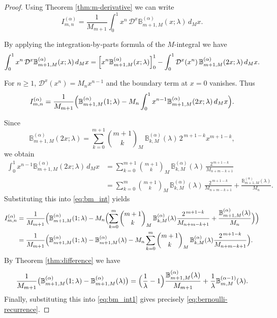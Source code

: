 \documentclass[12pt, a4paper]{article}
\theoremstyle{definition}
\numberwithin{equation}{section}
\newcommand{\B}{\mathbb{B}}
\begin{document}
\begin{proof}
Using Theorem \ref{thm:m-derivative} we can write
\[
I_{m,n}^{(\alpha)}=\frac{1}{M_{m+1}}\int_0^1 x^n\,\mathcal{D}^x\B_{m+1,M}^{(\alpha)}(x;\lambda)\,d_M x.
\]

By applying the integration‑by‑parts formula of the $M$-integral we have
\[
\int_0^1 x^n\,\mathcal{D}^x\B_{m+1,M}^{(\alpha)}(x;\lambda)\,d_M x
   = \Bigl[x^n\B_{m+1,M}^{(\alpha)}(x;\lambda)\Bigr]_0^1
     - \int_0^1 \mathcal{D}^x(x^n)\,\B_{m+1,M}^{(\alpha)}(2x;\lambda)\,d_M x.
\]

For $n\ge 1$, $\mathcal{D}^x(x^n)=M_n x^{n-1}$ and the boundary term at $x=0$ vanishes. Thus
\begin{equation} \label{eq:bm_int}
I_{m,n}^{(\alpha)}=\frac{1}{M_{m+1}}\Bigl(
   \B_{m+1,M}^{(\alpha)}(1;\lambda)
   -M_n\int_0^1 x^{n-1}\B_{m+1,M}^{(\alpha)}(2x;\lambda)\,d_M x\Bigr).
\end{equation}

Since
\[
\B_{m+1,M}^{(\alpha)}(2x;\lambda)=\sum_{k=0}^{m+1}\binom{m+1}{k}_M\,
   \B_{k,M}^{(\alpha)}(\lambda)\,2^{\,m+1-k}x^{m+1-k},
\]
we obtain
\begin{align*}
\int_0^1 x^{n-1}\B_{m+1,M}^{(\alpha)}(2x;\lambda)\,d_M x
   &=\sum_{k=0}^{m+1}\binom{m+1}{k}_M\,
     \B_{k,M}^{(\alpha)}(\lambda)\,\frac{2^{\,m+1-k}}{M_{n+m-k+1}}\\
   &=\sum_{k=0}^{m}\binom{m+1}{k}_M\,
   \B_{k,M}^{(\alpha)}(\lambda)\,\frac{2^{\,m+1-k}}{M_{n+m-k+1}} + \frac{\B_{m+1,M}^{(\alpha)}(\lambda)}{M_n}.
\end{align*}
Substituting this into \eqref{eq:bm_int} yields
\begin{align}\label{eq:bm_int1}
I_{m,n}^{(\alpha)} &=\frac{1}{M_{m+1}}\Bigl(
   \B_{m+1,M}^{(\alpha)}(1;\lambda)
   -M_n\Bigl(\sum_{k=0}^{m}\binom{m+1}{k}_M\,
      \B_{k,M}^{(\alpha)}(\lambda)\frac{2^{\,m+1-k}}{M_{n+m-k+1}}
      +\frac{\B_{m+1,M}^{(\alpha)}(\lambda)}{M_n}\Bigr)\Bigr)\notag\\
&=\frac{1}{M_{m+1}}\Bigl(
   \B_{m+1,M}^{(\alpha)}(1;\lambda)-\B_{m+1,M}^{(\alpha)}(\lambda)
   -M_n\sum_{k=0}^{m}\binom{m+1}{k}_M\,
      \B_{k,M}^{(\alpha)}(\lambda)\frac{2^{\,m+1-k}}{M_{n+m-k+1}}\Bigr).
\end{align}
By Theorem \ref{thm:difference} we have
\[
\frac{1}{M_{m+1}}\bigl(\B_{m+1,M}^{(\alpha)}(1;\lambda)-\B_{m+1,M}^{(\alpha)}(\lambda)\bigr)
   =\Bigl(\frac{1}{\lambda}-1\Bigr)\frac{\B_{m+1,M}^{(\alpha)}(\lambda)}{M_{m+1}}
     +\frac{1}{\lambda}\B_{m,M}^{(\alpha-1)}(\lambda).
\]
Finally, substituting this into \eqref{eq:bm_int1} gives precisely \eqref{eq:bernoulli-recurrence}.  
\end{proof}
\end{document}
